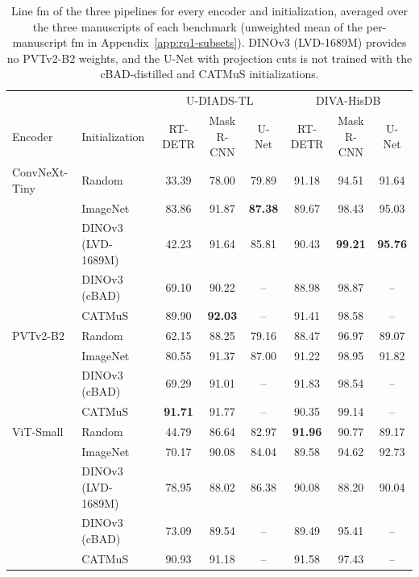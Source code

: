 \begin{table}[htbp]
    \centering
    \footnotesize
    \setlength{\tabcolsep}{3.5pt}
    \caption{Line \gls{fm} of the three pipelines for every encoder and initialization, averaged over the three manuscripts of each benchmark (unweighted mean of the per-manuscript \gls{fm} in Appendix~\ref{app:rq1-subsets}). DINOv3 (LVD-1689M) provides no PVTv2-B2 weights, and the U-Net with projection cuts is not trained with the cBAD-distilled and CATMuS initializations.}
    \label{tab:rq1-mean}
    \begin{tabular}{@{}llcccccc@{}}
        \toprule
        & & \multicolumn{3}{c}{U-DIADS-TL} & \multicolumn{3}{c}{DIVA-HisDB} \\
        \cmidrule(lr){3-5}\cmidrule(l){6-8}
        Encoder & Initialization & RT-DETR & \shortstack{Mask\\R-CNN} & U-Net & RT-DETR & \shortstack{Mask\\R-CNN} & U-Net \\
        \midrule
        ConvNeXt-Tiny & Random & 33.39 & 78.00 & 79.89 & 91.18 & 94.51 & 91.64 \\
                        & ImageNet & 83.86 & 91.87 & \textbf{87.38} & 89.67 & 98.43 & 95.03 \\
                        & DINOv3 (LVD-1689M) & 42.23 & 91.64 & 85.81 & 90.43 & \textbf{99.21} & \textbf{95.76} \\
                        & DINOv3 (cBAD) & 69.10 & 90.22 & -- & 88.98 & 98.87 & -- \\
                        & CATMuS & 89.90 & \textbf{92.03} & -- & 91.41 & 98.58 & -- \\
        \midrule
        PVTv2-B2 & Random & 62.15 & 88.25 & 79.16 & 88.47 & 96.97 & 89.07 \\
                        & ImageNet & 80.55 & 91.37 & 87.00 & 91.22 & 98.95 & 91.82 \\
                        & DINOv3 (cBAD) & 69.29 & 91.01 & -- & 91.83 & 98.54 & -- \\
                        & CATMuS & \textbf{91.71} & 91.77 & -- & 90.35 & 99.14 & -- \\
        \midrule
        ViT-Small & Random & 44.79 & 86.64 & 82.97 & \textbf{91.96} & 90.77 & 89.17 \\
                        & ImageNet & 70.17 & 90.08 & 84.04 & 89.58 & 94.62 & 92.73 \\
                        & DINOv3 (LVD-1689M) & 78.95 & 88.02 & 86.38 & 90.08 & 88.20 & 90.04 \\
                        & DINOv3 (cBAD) & 73.09 & 89.54 & -- & 89.49 & 95.41 & -- \\
                        & CATMuS & 90.93 & 91.18 & -- & 91.58 & 97.43 & -- \\
        \bottomrule
    \end{tabular}
\end{table}

